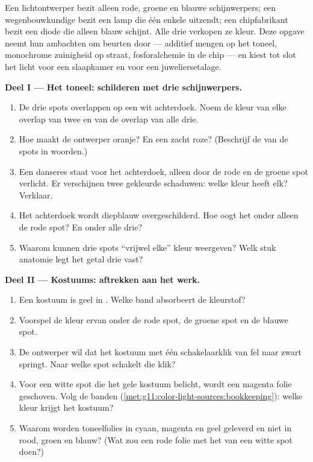 \begin{problem}
\label{pb:g11:color-light-sources:1}
Een lichtontwerper bezit alleen rode, groene en blauwe schijnwerpers; een
wegenbouwkundige bezit een lamp die één enkele  uitzendt; een
chipfabrikant bezit een diode die alleen blauw schijnt. Alle drie
verkopen ze kleur. Deze opgave neemt hun ambachten om beurten door ---
additief mengen op het toneel, monochrome zuinigheid op straat,
fosforalchemie in de chip --- en kiest tot slot het licht voor een
slaapkamer en voor een juweliersetalage.

\medskip
\noindent\textbf{Deel I --- Het toneel: schilderen met drie
schijnwerpers.}
\begin{enumerate}
  \item De drie spots overlappen op een wit achterdoek. Noem de kleur van
        elke overlap van twee en van de overlap van alle drie.
  \item Hoe maakt de ontwerper oranje? En een zacht roze? (Beschrijf de
         van de spots in woorden.)
  \item Een danseres staat voor het achterdoek, alleen door de rode en de
        groene spot verlicht. Er verschijnen twee gekleurde schaduwen:
        welke kleur heeft elk? Verklaar.
  \item Het achterdoek wordt diepblauw overgeschilderd. Hoe oogt het
        onder alleen de rode spot? En onder alle drie?
  \item Waarom kunnen drie spots ``vrijwel elke'' kleur weergeven? Welk
        stuk anatomie legt het getal drie vast?
\end{enumerate}

\medskip
\noindent\textbf{Deel II --- Kostuums: aftrekken aan het werk.}
\begin{enumerate}[resume]
  \item Een kostuum is geel in . Welke band absorbeert de
        kleurstof?
  \item Voorspel de kleur ervan onder de rode spot, de groene spot en de
        blauwe spot.
  \item De ontwerper wil dat het kostuum met één schakelaarklik van fel
        naar zwart springt. Naar welke spot schakelt die klik?
  \item Voor een witte spot die het gele kostuum belicht, wordt een
        magenta folie geschoven. Volg de banden
        (\cref{met:g11:color-light-sources:bookkeeping}): welke kleur
        krijgt het kostuum?
  \item Waarom worden toneelfolies in cyaan, magenta en geel geleverd en
        niet in rood, groen en blauw? (Wat zou een rode folie met het
         van een witte spot doen?)
\end{enumerate}


\end{problem}
